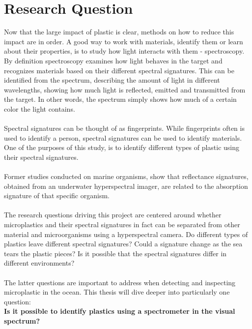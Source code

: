 \section{Research Question}
Now that the large impact of plastic is clear, methods on how to reduce this impact are in order. A good way to work with materials, identify them or learn about their properties, is to study how light interacts with them - spectroscopy. By definition spectroscopy examines how light behaves in the target and recognizes materials based on their different spectral signatures. This can be identified from the spectrum, describing the amount of light in different wavelengths, showing how much light is reflected, emitted and transmitted from the target. In other words, the spectrum simply shows how much of a certain color the light contains. 
\\\\
Spectral signatures can be thought of as fingerprints. While fingerprints often is used to identify a person, spectral signatures can be used to identify materials. One of the purposes of this study, is to identify different types of plastic using their spectral signatures. %
\\\\
Former studies conducted on marine organisms, show that reflectance signatures, obtained from an underwater hyperspectral imager, are related to the absorption signature of that specific organism. %
\\\\
The research questions driving this project are centered around whether microplastics and their spectral signatures in fact can be separated from other material and microorganisms using a hyperspectral camera. Do different types of plastics leave different spectral signatures? Could a signature change as the sea tears the plastic pieces? Is it possible that the spectral signatures differ in different environments?
\\\\
The latter questions are important to address when detecting and inspecting microplastic in the ocean. This thesis will dive deeper into particularly one question:\\ \textbf{Is it possible to identify plastics using a spectrometer in the visual spectrum?}

